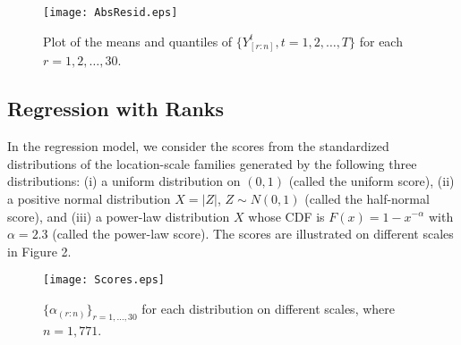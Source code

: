 \documentclass[12pt]{article}
\begin{document}
\begin{figure}[htb!]
 \centering
\begin{minipage}{0.6\textwidth}
  \texttt{[image: AbsResid.eps]}
\end{minipage}%
\caption{Plot of the means and quantiles of $\big\{Y_{[r:n]}^t, t=1,2,\ldots,T\big\}$ for 
each $r=1,2,\ldots,30$.}
\end{figure}

\subsection{Regression with Ranks} 

In the regression model, we consider the scores from the standardized 
distributions of the location-scale families generated by the following three 
distributions: (i) a uniform distribution on $(0,1)$ (called the uniform score), 
(ii) a positive normal distribution 
$X = |Z|$, $Z \sim N(0,1)$ (called the half-normal score), and (iii) a power-law 
distribution $X$ whose CDF is $F(x) = 1 - x^{-\alpha}$ with
 $\alpha = 2.3$ (called the power-law score). 
The scores are illustrated on different scales in Figure 2. 

\begin{figure}[htb!]
 \centering
\begin{minipage}{0.8\textwidth}
  \texttt{[image: Scores.eps]}
\end{minipage}
\caption{$\{ \alpha_{(r:n)}\}_{r=1,\ldots,30}$ for each distribution on different scales, where $n = 1,771$.} 
\end{figure}
\end{document}

